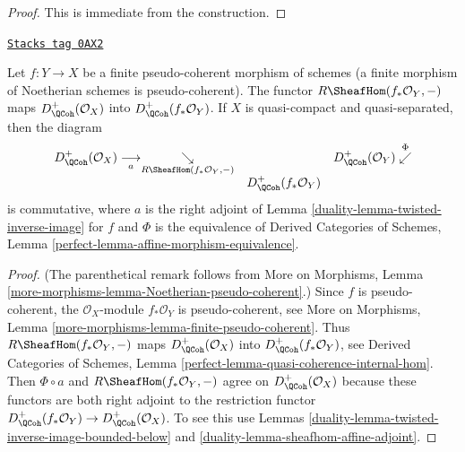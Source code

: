 \begin{proof}
This is immediate from the construction.
\end{proof}

\begin{lemma}
\label{duality-lemma-finite-twisted}
\href{https://stacks.math.columbia.edu/tag/0AX2}{\texttt{Stacks tag 0AX2}}

Let $f : Y \to X$ be a finite pseudo-coherent morphism of schemes
(a finite morphism of Noetherian schemes is pseudo-coherent).
The functor $R\SheafHom(f_*\mathcal{O}_Y, -)$ maps
$D_\QCoh^+(\mathcal{O}_X)$ into $D_\QCoh^+(f_*\mathcal{O}_Y)$.
If $X$ is quasi-compact and quasi-separated, then the diagram
$$
\begin{array}{ccc}D_\QCoh^+(\mathcal{O}_X) \underset{a}{\longrightarrow}\underset{R\SheafHom(f_*\mathcal{O}_Y, -)}{\searrow} &  & D_\QCoh^+(\mathcal{O}_Y) \overset{\Phi}{\swarrow} \\  & D_\QCoh^+(f_*\mathcal{O}_Y) & \end{array}
$$
is commutative, where $a$ is the right adjoint of
Lemma \ref{duality-lemma-twisted-inverse-image} for $f$ and $\Phi$ is the equivalence
of Derived Categories of Schemes, Lemma
\ref{perfect-lemma-affine-morphism-equivalence}.
\end{lemma}

\begin{proof}

(The parenthetical remark follows from More on Morphisms, Lemma
\ref{more-morphisms-lemma-Noetherian-pseudo-coherent}.)
Since $f$ is pseudo-coherent, the $\mathcal{O}_X$-module $f_*\mathcal{O}_Y$
is pseudo-coherent, see More on Morphisms, Lemma
\ref{more-morphisms-lemma-finite-pseudo-coherent}.
Thus $R\SheafHom(f_*\mathcal{O}_Y, -)$ maps
$D_\QCoh^+(\mathcal{O}_X)$ into
$D_\QCoh^+(f_*\mathcal{O}_Y)$, see
Derived Categories of Schemes, Lemma
\ref{perfect-lemma-quasi-coherence-internal-hom}.
Then $\Phi \circ a$ and $R\SheafHom(f_*\mathcal{O}_Y, -)$
agree on $D_\QCoh^+(\mathcal{O}_X)$ because these functors are
both right adjoint to the restriction functor
$D_\QCoh^+(f_*\mathcal{O}_Y) \to D_\QCoh^+(\mathcal{O}_X)$. To see this
use Lemmas \ref{duality-lemma-twisted-inverse-image-bounded-below} and
\ref{duality-lemma-sheafhom-affine-adjoint}.
\end{proof}

